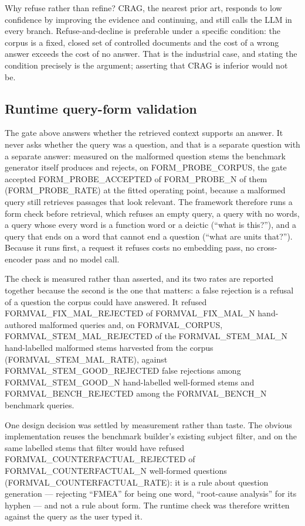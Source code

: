\documentclass[preprint,3p,times]{elsarticle}
\begin{document}
Why refuse rather than refine? CRAG, the nearest prior art, responds to low
confidence by improving the evidence and continuing, and still calls the LLM in
every branch. Refuse-and-decline is preferable under a specific condition: the
corpus is a fixed, closed set of controlled documents and the cost of a wrong
answer exceeds the cost of no answer. That is the industrial case, and stating
the condition precisely is the argument; asserting that CRAG is inferior would
not be.

\subsection{Runtime query-form validation}

The gate above answers whether the retrieved context supports an answer. It
never asks whether the query was a question, and that is a separate question
with a separate answer: measured on the malformed question stems the benchmark
generator itself produces and rejects, on {{FORM_PROBE_CORPUS}}, the gate accepted
{{FORM_PROBE_ACCEPTED}} of {{FORM_PROBE_N}} of them ({{FORM_PROBE_RATE}}) at the fitted operating
point, because a malformed query still retrieves passages that look relevant.
The framework therefore runs a form check before retrieval, which refuses an
empty query, a query with no words, a query whose every word is a function
word or a deictic (``what is this?''), and a query that ends on a word that
cannot end a question (``what are units that?''). Because it runs first, a
request it refuses costs no embedding pass, no cross-encoder pass and no model
call.

The check is measured rather than asserted, and its two rates are reported
together because the second is the one that matters: a false rejection is a
refusal of a question the corpus could have answered. It refused
{{FORMVAL_FIX_MAL_REJECTED}} of {{FORMVAL_FIX_MAL_N}} hand-authored malformed
queries and, on {{FORMVAL_CORPUS}}, {{FORMVAL_STEM_MAL_REJECTED}} of the
{{FORMVAL_STEM_MAL_N}} hand-labelled malformed stems harvested from the corpus
({{FORMVAL_STEM_MAL_RATE}}), against {{FORMVAL_STEM_GOOD_REJECTED}} false
rejections among {{FORMVAL_STEM_GOOD_N}} hand-labelled well-formed stems and
{{FORMVAL_BENCH_REJECTED}} among the {{FORMVAL_BENCH_N}} benchmark queries.

One design decision was settled by measurement rather than taste. The obvious
implementation reuses the benchmark builder's existing subject filter, and on
the same labelled stems that filter would have refused
{{FORMVAL_COUNTERFACTUAL_REJECTED}} of {{FORMVAL_COUNTERFACTUAL_N}}
well-formed questions ({{FORMVAL_COUNTERFACTUAL_RATE}}): it is a rule about
question generation --- rejecting ``FMEA'' for being one word,
``root-cause analysis'' for its hyphen --- and not a rule about form. The
runtime check was therefore written against the query as the user typed it.
\end{document}

